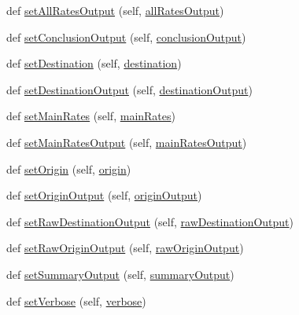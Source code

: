 \begin{DoxyCompactItemize}
def \hyperlink{classe2e_1_1_parameters_a23a4ae20df9dbbb411654c45c5bbfa17}{set\+All\+Rates\+Output} (self, \hyperlink{classe2e_1_1_parameters_ac5dfd879a297879921d905de68f7febb}{all\+Rates\+Output})
\item 
def \hyperlink{classe2e_1_1_parameters_a4ec249739947f4643b6d2dc811ef2639}{set\+Conclusion\+Output} (self, \hyperlink{classe2e_1_1_parameters_ad5967b78ebf5c8778e423413053015a7}{conclusion\+Output})
\item 
def \hyperlink{classe2e_1_1_parameters_ac63ae6d2b5f45ae78ee855953a038f14}{set\+Destination} (self, \hyperlink{classe2e_1_1_parameters_ad2cdf746b8890c53a9cab6fd7df7043b}{destination})
\item 
def \hyperlink{classe2e_1_1_parameters_a96083de53012ca50d2a345a1673802de}{set\+Destination\+Output} (self, \hyperlink{classe2e_1_1_parameters_a3b4ae5aa9b73466e51018b6f37792577}{destination\+Output})
\item 
def \hyperlink{classe2e_1_1_parameters_a57b1265982f14c075d2f1ab909383f5d}{set\+Main\+Rates} (self, \hyperlink{classe2e_1_1_parameters_aaa2b41d7017ab4893bbe27fa8edb7180}{main\+Rates})
\item 
def \hyperlink{classe2e_1_1_parameters_ae71495be8b331f293e0d66b3251a21e9}{set\+Main\+Rates\+Output} (self, \hyperlink{classe2e_1_1_parameters_a552470d8541b7caf2bb8940e32a6fe0e}{main\+Rates\+Output})
\item 
def \hyperlink{classe2e_1_1_parameters_a421e56e53ff0aaf5222229d8a81c456b}{set\+Origin} (self, \hyperlink{classe2e_1_1_parameters_aff4d7aaa35295f7f71e546fe5554c4d9}{origin})
\item 
def \hyperlink{classe2e_1_1_parameters_a2b87a3357a16d35b7606a97e924a4904}{set\+Origin\+Output} (self, \hyperlink{classe2e_1_1_parameters_ab1ac2fc0ab2f3ef169b776c776cdb225}{origin\+Output})
\item 
def \hyperlink{classe2e_1_1_parameters_a2a4420c79bef43533fe2d9562d0faedb}{set\+Raw\+Destination\+Output} (self, \hyperlink{classe2e_1_1_parameters_a84b319098084ed505e089a600e154f6e}{raw\+Destination\+Output})
\item 
def \hyperlink{classe2e_1_1_parameters_a6a69b8936b79b34f612b3dda7bedc67f}{set\+Raw\+Origin\+Output} (self, \hyperlink{classe2e_1_1_parameters_a62b586d9863422872833e34814ac51e6}{raw\+Origin\+Output})
\item 
def \hyperlink{classe2e_1_1_parameters_af904cdd913f0ffd64f28c9f7b1137389}{set\+Summary\+Output} (self, \hyperlink{classe2e_1_1_parameters_a1f4bab2e746d2c598e20ccba0154d795}{summary\+Output})
\item 
def \hyperlink{classe2e_1_1_parameters_a9d1ef6cf9aaac08105966db43687423f}{set\+Verbose} (self, \hyperlink{classe2e_1_1_parameters_a84d862bf507bb0325f5daf3b7e5d9ab3}{verbose})
\end{DoxyCompactItemize}
